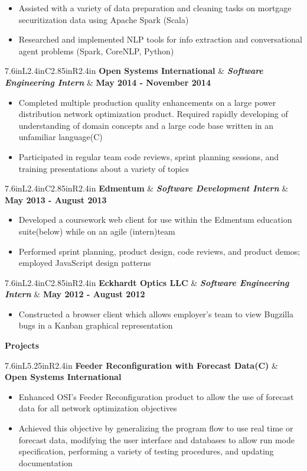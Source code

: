 \documentclass[letterpaper,10pt]{article}
\newcommand{\resitem}[1]{\item[$\triangleright$] #1 

\vspace{-.1in}
}
\newcommand{\resheading}[1]{
	{
		\large\colorbox{mygrey}
		{
			\begin{minipage}{.98\textwidth}

			\centerline{\textbf{#1 \vphantom{p\^{E}}}}
			\end{minipage}
		}
	}
}
\newcommand{\ressubheadingg}[2]{
	\begin{tabular*}{7.6in}{L{5.25in}R{2.4in}}
			\textbf{#1} & \textbf{#2}
	\end{tabular*}
}
\newcommand{\rressubheading}[3]{
	\begin{tabular*}{7.6in}{L{2.4in}C{2.85in}R{2.4in}}
			\textbf{#1} & \textit{\textbf{#2}}  & \textbf{#3}
	\end{tabular*}\vspace{-12pt}
}
\begin{document}
			\begin{itemize}
				\resitem{Assisted with a variety of data preparation and cleaning tasks on mortgage securitization data using Apache Spark (Scala)}
				\resitem{Researched and implemented NLP tools for info extraction and conversational agent problems (Spark, CoreNLP, Python)}
			\end{itemize}
			\vspace{.1in}
		\rressubheading{Open Systems International}{Software Engineering Intern}{May 2014 - November 2014}
			\vspace{-.1in}
			\begin{itemize}
				\resitem{Completed multiple production quality enhancements on a large power distribution network optimization product. Required rapidly developing of understanding of domain concepts and a large code base written in an unfamiliar language(C)}
				\resitem{Participated in regular team code reviews, sprint planning sessions, and training presentations about a variety of topics}
			\end{itemize}
			\vspace{.1in}
		\rressubheading{Edmentum}{Software Development Intern}{May 2013 - August 2013}
			\vspace{-.1in}
			\begin{itemize}
				\resitem{Developed a coursework web client for use within the Edmentum education suite(below) while on an agile (intern)team}
				\resitem{Performed sprint planning, product design, code reviews, and product demos; employed JavaScript design patterns}
			\end{itemize}
			\vspace{.1in}
			\rressubheading{Eckhardt Optics LLC}{Software Engineering Intern}{May 2012 - August 2012}
			\vspace{-.1in}
			\begin{itemize}
				\resitem{Constructed a browser client which allows employer's team to view Bugzilla bugs in a Kanban graphical representation}
			\end{itemize}
			\vspace{.1in}
	\resheading{Projects}
		\ressubheadingg{Feeder Reconfiguration with Forecast Data(C)}{Open Systems International}
			\vspace{-.25in}
			\begin{itemize}
				\resitem{Enhanced OSI's Feeder Reconfiguration product to allow the use of forecast data for all network optimization objectives}
				\resitem{Achieved this objective by generalizing the program flow to use real time or forecast data, modifying the user interface and databases to allow run mode specification, performing a variety of testing procedures, and updating documentation}
			\end{itemize}
\end{document}
